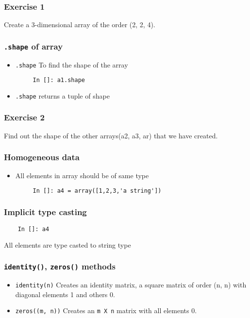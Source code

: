 \documentclass[presentation]{beamer}
\begin{document}
\begin{frame}
\frametitle{Exercise 1}
\label{sec-7}

  Create a 3-dimensional array of the order (2, 2, 4).
\end{frame}
\begin{frame}[fragile]
\frametitle{\texttt{.shape} of array}
\label{sec-8}

\begin{itemize}
\item \texttt{.shape}
    To find the shape of the array
\begin{verbatim}
     In []: a1.shape
\end{verbatim}

\item \texttt{.shape}
    returns a tuple of shape
\end{itemize}
\end{frame}
\begin{frame}
\frametitle{Exercise 2}
\label{sec-9}

  Find out the shape of the other arrays(a2, a3, ar) that we have created.
\end{frame}
\begin{frame}[fragile]
\frametitle{Homogeneous data}
\label{sec-10}

\begin{itemize}
\item All elements in array should be of same type
\begin{verbatim}
     In []: a4 = array([1,2,3,'a string'])
\end{verbatim}

\end{itemize}
\end{frame}
\begin{frame}[fragile]
\frametitle{Implicit type casting}
\label{sec-11}

\begin{verbatim}
    In []: a4
\end{verbatim}

    All elements are type casted to string type
\end{frame}
\begin{frame}
\frametitle{\texttt{identity()}, \texttt{zeros()} methods}
\label{sec-12}

\begin{itemize}
\item \texttt{identity(n)}
    Creates an identity matrix, a square matrix of order (n, n) with diagonal elements 1 and others 0.
\item \texttt{zeros((m, n))}
    Creates an \texttt{m X n} matrix with all elements 0.
\end{itemize}
\end{frame}
\end{document}
